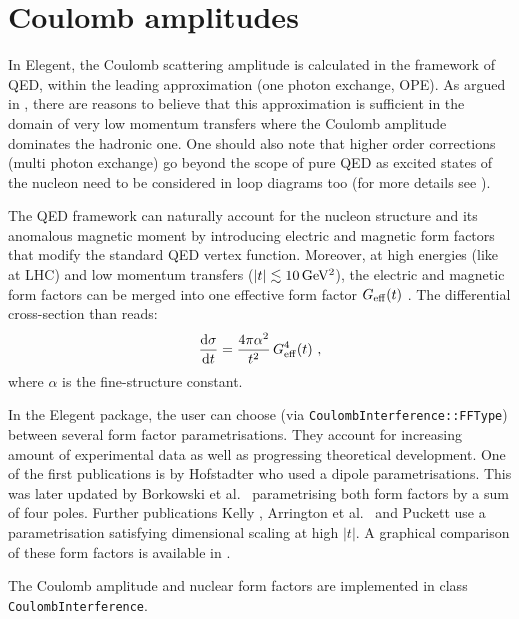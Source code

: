 \documentclass[preprint,12pt]{elsarticle}
\def\d{{\rm d}}
\def\un#1{{\,\rm #1}}
\begin{document}

\section{Coulomb amplitudes}\label{s:coul mod}

In Elegent, the Coulomb scattering amplitude is calculated in the framework of QED, within the leading approximation (one photon exchange, OPE). As argued in \cite[section 1.3.6]{jan_thesis}, there are reasons to believe that this approximation is sufficient in the domain of very low momentum transfers where the Coulomb amplitude dominates the hadronic one. One should also note that higher order corrections (multi photon exchange) go beyond the scope of pure QED as excited states of the nucleon need to be considered in loop diagrams too (for more details see \cite{arrington07,puckett10}).

The QED framework can naturally account for the nucleon structure and its anomalous magnetic moment by introducing electric and magnetic form factors that modify the standard QED vertex function. Moreover, at high energies (like at LHC) and low momentum transfers ($|t| \lesssim 10\un{GeV^2}$), the electric and magnetic form factors can be merged into one effective form factor $G_{\rm eff}(t)$ \cite[equation (31)]{block06}. The differential cross-section than reads:
\begin{equation}
{\d\sigma\over\d t} = {4\pi \alpha^2\over t^2}\, G_{\rm eff}^4(t)\ ,
\end{equation}
where $\alpha$ is the fine-structure constant.

In the Elegent package, the user can choose (via {\tt CoulombInterference::\discretionary{}{}{}FFType}) between several form factor parametrisations. They account for increasing amount of experimental data as well as progressing theoretical development. One of the first publications is by Hofstadter \cite{hofstadter58} who used a dipole parametrisations. This was later updated by Borkowski et al.~\cite{borkowski74,borkowski75} parametrising both form factors by a sum of four poles. Further publications Kelly \cite{kelly04}, Arrington et al.~\cite{arrington07} and Puckett \cite{puckett10} use a parametrisation satisfying dimensional scaling at high $|t|$. A graphical comparison of these form factors is available in \cite[Figure~1.7]{jan_thesis}.

The Coulomb amplitude and nuclear form factors are implemented in class {\tt CoulombInterference}.
\end{document}
